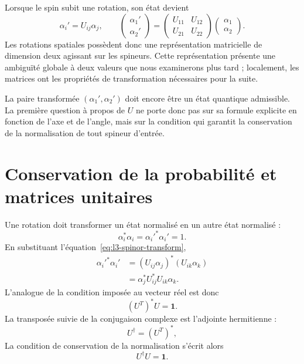 Lorsque le spin subit une rotation, son état devient
\begin{equation}
\alpha_i'=U_{ij}\alpha_j,
\qquad
\begin{pmatrix}\alpha_1'\\\alpha_2'\end{pmatrix}
=
\begin{pmatrix}
U_{11}&U_{12}\\
U_{21}&U_{22}
\end{pmatrix}
\begin{pmatrix}\alpha_1\\\alpha_2\end{pmatrix}.
\label{eq:l3-spinor-transform}
\end{equation}
Les rotations spatiales possèdent donc une représentation matricielle de dimension deux agissant sur les spineurs. Cette représentation présente une ambiguïté globale à deux valeurs que nous examinerons plus tard ; localement, les matrices ont les propriétés de transformation nécessaires pour la suite.

La paire transformée \((\alpha_1',\alpha_2')\) doit encore être un état quantique admissible. La première question à propos de \(U\) ne porte donc pas sur sa formule explicite en fonction de l’axe et de l’angle, mais sur la condition qui garantit la conservation de la normalisation de tout spineur d’entrée.

\section{Conservation de la probabilité et matrices unitaires}

Une rotation doit transformer un état normalisé en un autre état normalisé :
\begin{equation}
\alpha_i^*\alpha_i=\alpha_i'^*\alpha_i'=1.
\end{equation}
En substituant l’équation~\eqref{eq:l3-spinor-transform},
\begin{align}
\alpha_i'^*\alpha_i'
 &=(U_{ij}\alpha_j)^*(U_{ik}\alpha_k)\\
 &=\alpha_j^*U_{ij}^*U_{ik}\alpha_k.
\end{align}
L’analogue de la condition imposée au vecteur réel est donc
\begin{equation}
(U^T)^*U=\boldsymbol 1.
\end{equation}
La transposée suivie de la conjugaison complexe est l’adjointe hermitienne :
\begin{equation}
U^\dagger=(U^T)^*,
\end{equation}
La condition de conservation de la normalisation s’écrit alors
\begin{equation}
U^\dagger U=\boldsymbol 1.
\label{eq:l3-unitarity}
\end{equation}

